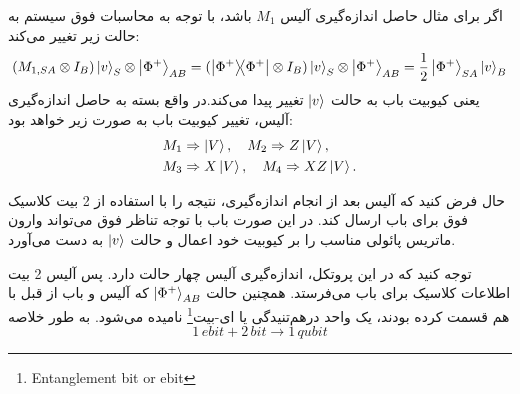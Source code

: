   اگر برای مثال حاصل اندازه‌گیری آلیس $M_{1}$ باشد، با توجه به محاسبات فوق سیستم به حالت زیر تغییر می‌کند:
  \begin{equation}
  	(M_{1,SA} \otimes I_{B}) \ket{v}_{S} \otimes \ket{\Phi^{+}}_{AB} = (\dyad{\Phi^{+}}{\Phi^{+}} \otimes I_{B}) \ket{v}_{S} \otimes \ket{\Phi^{+}}_{AB} = \frac{1}{2}\ket{\Phi^{+}}_{SA}\ket{v}_{B}
  \end{equation}
  یعنی کیوبیت باب به حالت $\ket{v}$ تغییر پیدا می‌کند.در واقع بسته به حاصل اندازه‌گیری آلیس، تغییر کیوبیت باب به صورت زیر خواهد بود:
  \begin{equation}
  	\begin{split}
  	&  M_{1} \Rightarrow \ket{V}, \quad M_{2} \Rightarrow Z\ket{V},\\
  	& M_{3} \Rightarrow X\ket{V}, \quad M_{4} \Rightarrow XZ\ket{V}.
  	\end{split}
  \end{equation}
  
  حال فرض کنید که آلیس بعد از انجام اندازه‌گیری، نتیجه را با استفاده از 2 بیت کلاسیک فوق برای باب ارسال کند. در این صورت باب با توجه تناظر فوق می‌تواند وارون ماتریس پائولی مناسب را بر کیوبیت خود اعمال و حالت $\ket{v}$ به دست می‌آورد. 
  
  توجه کنید که در این پروتکل، اندازه‌گیری آلیس چهار حالت دارد. پس آلیس 2 بیت اطلاعات کلاسیک برای باب می‌فرستد. همچنین حالت $\ket{\Phi^{+}}_{AB}$ که آلیس و باب از قبل با هم قسمت کرده بودند، یک واحد درهم‌تنیدگی یا ای-بیت\footnote{Entanglement bit or ebit}  نامیده می‌شود. به طور خلاصه
  \begin{equation}
  	1 \, ebit + 2 \, bit \rightarrow 1 \, qubit
\end{equation}   

